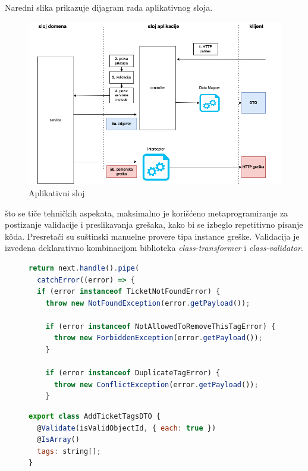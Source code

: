 \documentclass[12pt,oneside]{memoir}
\begin{document}
Naredni slika prikazuje dijagram rada aplikativnog sloja.

\begin{figure}[h]
  \centering
  \includegraphics[width=1\textwidth]{docs/images/ch_2/applayer.png} 
  \caption{Aplikativni sloj}
  \label{fig:sample}
\end{figure}

što se tiče tehničkih aspekata, maksimalno je korišćeno metaprogramiranje za postizanje validacije i preslikavanja grešaka, kako bi se izbeglo repetitivno pisanje k\^{o}da. Presretači su suštinski manuelne provere tipa instance greške. Validacija je izvedena deklarativno kombinacijom biblioteka \textit{class-transformer} i \textit{class-validator}.

\begin{figure}[h]
\begin{lstlisting}[language=JavaScript, style=ES6, caption={presretač}]
return next.handle().pipe(
  catchError((error) => {
  if (error instanceof TicketNotFoundError) {
    throw new NotFoundException(error.getPayload());

    if (error instanceof NotAllowedToRemoveThisTagError) {
      throw new ForbiddenException(error.getPayload());
    }

    if (error instanceof DuplicateTagError) {
      throw new ConflictException(error.getPayload());
    }
\end{lstlisting}
\end{figure}




\begin{figure}[h]
\begin{lstlisting}[language=JavaScript, style=ES6, caption={validacija ulaznog DTO-a}]
export class AddTicketTagsDTO {
  @Validate(isValidObjectId, { each: true })
  @IsArray()
  tags: string[];
}
\end{lstlisting}
\end{figure}
\end{document}
